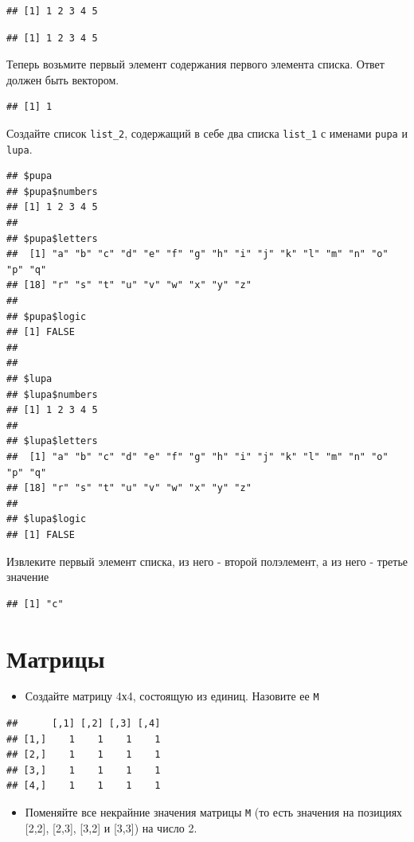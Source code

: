 \documentclass[]{book}
\providecommand{\tightlist}{%
  \setlength{\itemsep}{0pt}\setlength{\parskip}{0pt}}
\begin{document}
\begin{verbatim}
## [1] 1 2 3 4 5
\end{verbatim}

\begin{verbatim}
## [1] 1 2 3 4 5
\end{verbatim}

Теперь возьмите первый элемент содержания первого элемента списка. Ответ должен быть вектором.

\begin{verbatim}
## [1] 1
\end{verbatim}

Создайте список \texttt{list\_2}, содержащий в себе два списка \texttt{list\_1} с именами \texttt{pupa} и \texttt{lupa}.

\begin{verbatim}
## $pupa
## $pupa$numbers
## [1] 1 2 3 4 5
## 
## $pupa$letters
##  [1] "a" "b" "c" "d" "e" "f" "g" "h" "i" "j" "k" "l" "m" "n" "o" "p" "q"
## [18] "r" "s" "t" "u" "v" "w" "x" "y" "z"
## 
## $pupa$logic
## [1] FALSE
## 
## 
## $lupa
## $lupa$numbers
## [1] 1 2 3 4 5
## 
## $lupa$letters
##  [1] "a" "b" "c" "d" "e" "f" "g" "h" "i" "j" "k" "l" "m" "n" "o" "p" "q"
## [18] "r" "s" "t" "u" "v" "w" "x" "y" "z"
## 
## $lupa$logic
## [1] FALSE
\end{verbatim}

Извлеките первый элемент списка, из него - второй полэлемент, а из него - третье значение

\begin{verbatim}
## [1] "c"
\end{verbatim}

\hypertarget{t}{%
\section{Матрицы}\label{t}}

\begin{itemize}
\tightlist
\item
  Создайте матрицу 4х4, состоящую из единиц. Назовите ее \texttt{M}
\end{itemize}

\begin{verbatim}
##      [,1] [,2] [,3] [,4]
## [1,]    1    1    1    1
## [2,]    1    1    1    1
## [3,]    1    1    1    1
## [4,]    1    1    1    1
\end{verbatim}

\begin{itemize}
\tightlist
\item
  Поменяйте все некрайние значения матрицы \texttt{M} (то есть значения на позициях {[}2,2{]}, {[}2,3{]}, {[}3,2{]} и {[}3,3{]}) на число 2.
\end{itemize}
\end{document}
